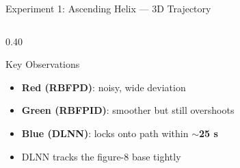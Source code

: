 \documentclass[aspectratio=169,10pt]{beamer}
\begin{document}
\begin{frame}{Experiment 1: Ascending Helix — 3D Trajectory}
\begin{columns}[T, onlytextwidth]
\begin{column}{0.40\textwidth}
\begin{block}{\small Key Observations}
\begin{itemize}
\item \textcolor{warnred}{\textbf{Red (RBFPD)}}:
noisy, wide deviation

\item \textcolor{okgreen}{\textbf{Green (RBFPID)}}:
smoother but still overshoots

\item \textcolor{dlnncolor}{\textbf{Blue (DLNN)}}:
locks onto path within
\textbf{$\sim$25 s}

\item DLNN tracks the figure-8 base tightly

\end{itemize}

\end{block}

\end{column}

\end{columns}

\end{frame}
\end{document}
